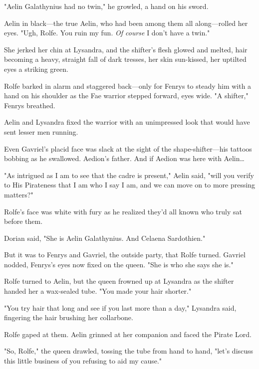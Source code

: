 "Aelin Galathynius had no twin," he growled, a hand on his sword.

Aelin in black---the true Aelin, who had been among them all along---rolled her eyes.
"Ugh, Rolfe.
You ruin my fun.
\emph{Of course}
I don't have a twin."

She jerked her chin at Lysandra, and the shifter's flesh glowed and melted, hair becoming a heavy, straight fall of dark tresses, her skin sun-kissed, her uptilted eyes a striking green.

Rolfe barked in alarm and staggered back---only for Fenrys to steady him with a hand on his shoulder as the Fae warrior stepped forward, eyes wide.
"A shifter," Fenrys breathed.

Aelin and Lysandra fixed the warrior with an unimpressed look that would have sent lesser men running.

Even Gavriel's placid face was slack at the sight of the shape-shifter---his tattoos bobbing as he swallowed.
Aedion's father.
And if Aedion was here with Aelin\ldots{}

"As intrigued as I am to see that the cadre is present," Aelin said, "will you verify to His Pirateness that I am who I say I am, and we can move on to more pressing matters?"

Rolfe's face was white with fury as he realized they'd all known who truly sat before them.

Dorian said, "She is Aelin Galathynius.
And Celaena Sardothien."

But it was to Fenrys and Gavriel, the outside party, that Rolfe turned.
Gavriel nodded, Fenrys's eyes now fixed on the queen.
"She is who she says she is."

Rolfe turned to Aelin, but the queen frowned up at Lysandra as the shifter handed her a wax-sealed tube.
"You made your hair shorter."

"You try hair that long and see if you last more than a day," Lysandra said, fingering the hair brushing her collarbone.

Rolfe gaped at them.
Aelin grinned at her companion and faced the Pirate Lord.

"So, Rolfe," the queen drawled, tossing the tube from hand to hand, "let's discuss this little business of you refusing to aid my cause."
